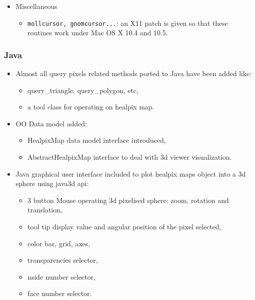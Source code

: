 \documentclass[12pt,twoside]{article}
\begin{document}
{{\begin{itemize}
\begin{itemize}
\item {{\tt median\_filter}}: bugs correction
\item {{\tt ud\_grade}}: more robust user interface
\item {{\tt change\_polcconv}}: new {\tt /FORCE} keyword
\item {{\tt remove\_dipole}}: more accurate
\item {{\tt query\_disc}}: when the disc center is on one of
the poles, {\em only} the pixels overlapping with the disc are now returned.
\end{itemize}
%
\item Miscellaneous
\begin{itemize}
\item {{\tt mollcursor, gnomcursor...}}: an X11 patch is
given so that these routines work under Mac OS X 10.4 and 10.5.
\end{itemize}
\end{itemize}
\subsubsection[New Features: Java]{Java}
  \begin{itemize}
    \item Almost all query pixels related methods ported to Java have been added
 like:
  \begin{itemize}
  \item query\_triangle, query\_polygon, etc,
  \item a tool class for operating on healpix map.
  \end{itemize}

  \item OO Data model added:
  \begin{itemize}
  \item HealpixMap data model interface introduced,
  \item AbstractHealpixMap interface to deal with 3d viewer visualization.
  \end{itemize}

  \item Java graphical user interface included to plot healpix maps object
into a 3d sphere using java3d api:
  \begin{itemize}
  \item 3 button Mouse operating 3d pixelised sphere: zoom, rotation and translation,
  \item tool tip display value and angular position of the pixel selected,
  \item color bar, grid, axes,
  \item transparencies selector,
  \item nside number selector,
  \item face number selector.
  \end{itemize}


\end{itemize}}}
\end{document}
